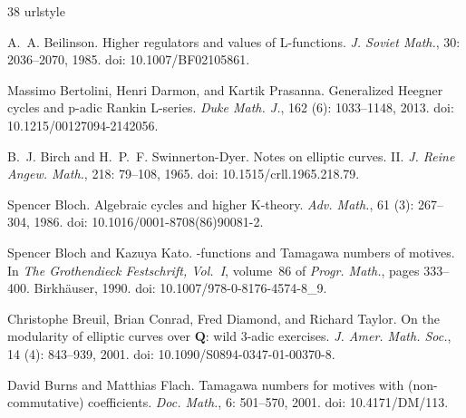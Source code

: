 \documentclass[11pt]{article}
\theoremstyle{definition}
\begin{document}
\clearpage
\begingroup
\raggedright
\small

\begin{thebibliography}{38}
\providecommand{\natexlab}[1]{#1}
\providecommand{\url}[1]{\texttt{#1}}
\expandafter\ifx\csname urlstyle\endcsname\relax
  \providecommand{\doi}[1]{doi: #1}\else
  \providecommand{\doi}{doi: \begingroup \urlstyle{rm}\Url}\fi

A.~A. Beilinson.
\newblock Higher regulators and values of {L}-functions.
\newblock \emph{J. Soviet Math.}, 30: 2036--2070, 1985.
\newblock \doi{10.1007/BF02105861}.

Massimo Bertolini, Henri Darmon, and Kartik Prasanna.
\newblock Generalized {Heegner} cycles and p-adic {Rankin} {L}-series.
\newblock \emph{Duke Math. J.}, 162 (6): 1033--1148, 2013.
\newblock \doi{10.1215/00127094-2142056}.

B.~J. Birch and H.~P.~F. Swinnerton-Dyer.
\newblock Notes on elliptic curves. {II}.
\newblock \emph{J. Reine Angew. Math.}, 218: 79--108, 1965.
\newblock \doi{10.1515/crll.1965.218.79}.

Spencer Bloch.
\newblock Algebraic cycles and higher {K}-theory.
\newblock \emph{Adv. Math.}, 61 (3): 267--304, 1986.
\newblock \doi{10.1016/0001-8708(86)90081-2}.

Spencer Bloch and Kazuya Kato.
-functions and {T}amagawa numbers of motives.
\newblock In \emph{The {Grothendieck} {Festschrift}, Vol.~I}, volume~86 of \emph{Progr. Math.}, pages 333--400. Birkh\"auser, 1990.
\newblock \doi{10.1007/978-0-8176-4574-8_9}.

Christophe Breuil, Brian Conrad, Fred Diamond, and Richard Taylor.
\newblock On the modularity of elliptic curves over {$\mathbf{Q}$}: wild 3-adic exercises.
\newblock \emph{J. Amer. Math. Soc.}, 14 (4): 843--939, 2001.
\newblock \doi{10.1090/S0894-0347-01-00370-8}.

David Burns and Matthias Flach.
\newblock Tamagawa numbers for motives with (non-commutative) coefficients.
\newblock \emph{Doc. Math.}, 6: 501--570, 2001.
\newblock \doi{10.4171/DM/113}.


\end{thebibliography}
\end{document}
